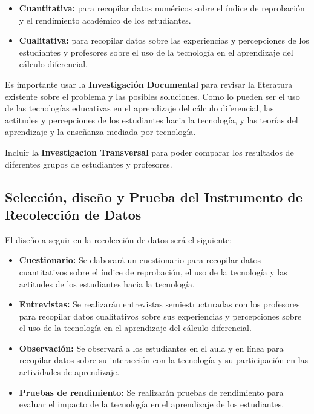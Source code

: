 \documentclass{article}
\begin{document}
\begin{itemize}
  \item \textbf{Cuantitativa:} para recopilar datos numéricos sobre el índice de reprobación y el rendimiento académico de los estudiantes.
  \item \textbf{Cualitativa:} para recopilar datos sobre las experiencias y percepciones de los estudiantes y profesores sobre el uso de la tecnología en el aprendizaje del cálculo diferencial.
\end{itemize}

Es importante usar la \textbf{Investigación Documental} para revisar la literatura existente sobre el problema y las posibles soluciones. Como lo pueden ser el uso de las tecnologías educativas en el aprendizaje del cálculo diferencial, las actitudes y percepciones de los estudiantes hacia la tecnología, y las teorías del aprendizaje y la enseñanza mediada por tecnología. 

Incluir la \textbf{Investigacion Transversal} para poder comparar los resultados de diferentes grupos de estudiantes y profesores.

\newpage

\subsection{Selección, diseño y Prueba del Instrumento de Recolección de Datos}
El diseño a seguir en la recolección de datos será el siguiente:
\begin{itemize}
  \item \textbf{Cuestionario:} Se elaborará un cuestionario para recopilar datos cuantitativos sobre el índice de reprobación, el uso de la tecnología y las actitudes de los estudiantes hacia la tecnología.
  \item \textbf{Entrevistas:} Se realizarán entrevistas semiestructuradas con los profesores para recopilar datos cualitativos sobre sus experiencias y percepciones sobre el uso de la tecnología en el aprendizaje del cálculo diferencial.
  \item \textbf{Observación:} Se observará a los estudiantes en el aula y en línea para recopilar datos sobre su interacción con la tecnología y su participación en las actividades de aprendizaje.
  \item \textbf{Pruebas de rendimiento:} Se realizarán pruebas de rendimiento para evaluar el impacto de la tecnología en el aprendizaje de los estudiantes.
\end{itemize}
\end{document}
